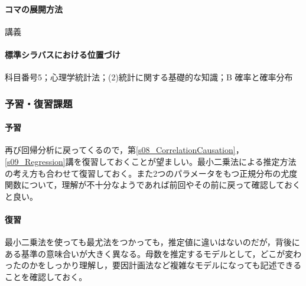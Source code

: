 \paragraph{コマの展開方法}
講義
\paragraph{標準シラバスにおける位置づけ}
科目番号5；心理学統計法；(2)統計に関する基礎的な知識；B 確率と確率分布
\subsubsection{予習・復習課題}
\paragraph{予習}
再び回帰分析に戻ってくるので，第\ref{s08_CorrelationCausation}，\ref{s09_Regression}講を復習しておくことが望ましい。最小二乗法による推定方法の考え方も合わせて復習しておく。また2つのパラメータをもつ正規分布の尤度関数について，理解が不十分なようであれば前回やその前に戻って確認しておくと良い。
\paragraph{復習}
最小二乗法を使っても最尤法をつかっても，推定値に違いはないのだが，背後にある基準の意味合いが大きく異なる。母数を推定するモデルとして，どこが変わったのかをしっかり理解し，要因計画法など複雑なモデルになっても記述できることを確認しておく。
